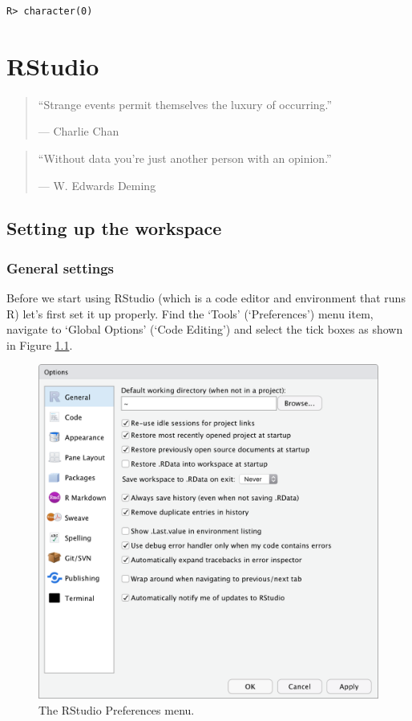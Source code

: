 \documentclass[]{book}
\theoremstyle{definition}
\theoremstyle{definition}
\theoremstyle{definition}
\theoremstyle{remark}
\begin{document}
\begin{verbatim}
R> character(0)
\end{verbatim}

\chapter{RStudio}\label{rstudio}

\begin{quote}
``Strange events permit themselves the luxury of occurring.''

--- Charlie Chan
\end{quote}

\begin{quote}
``Without data you're just another person with an opinion.''

--- W. Edwards Deming
\end{quote}

\section{Setting up the workspace}\label{setting-up-the-workspace}

\subsection{General settings}\label{general-settings}

Before we start using RStudio (which is a code editor and environment
that runs R) let's first set it up properly. Find the `Tools'
(`Preferences') menu item, navigate to `Global Options' (`Code Editing')
and select the tick boxes as shown in Figure \ref{fig:RStudio-prefs}.

\begin{figure}

{\centering \includegraphics[width=1\linewidth]{figures/RStudio_preferences} 

}

\caption{The RStudio Preferences menu.}\label{fig:RStudio-prefs}
\end{figure}
\end{document}
